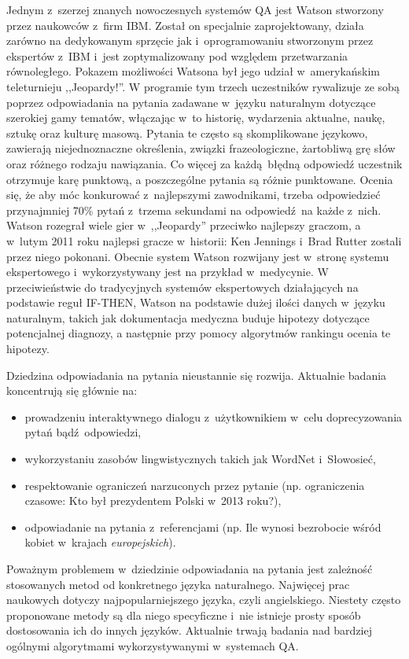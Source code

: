\documentclass[a4paper, twoside, openright, 12pt]{report}
\begin{document}
            Jednym z~szerzej znanych nowoczesnych systemów QA jest Watson stworzony przez naukowców z~firm IBM.
            Został on specjalnie zaprojektowany, działa zarówno na dedykowanym sprzęcie jak i~oprogramowaniu stworzonym
            przez ekspertów z~IBM i~jest zoptymalizowany pod względem przetwarzania równoległego.
            Pokazem możliwości Watsona był jego udział w~amerykańskim teleturnieju ,,Jeopardy!''. W programie tym
            trzech uczestników rywalizuje ze sobą poprzez odpowiadania na pytania zadawane w~języku naturalnym dotyczące
            szerokiej gamy tematów, włączając w~to historię, wydarzenia aktualne, naukę, sztukę oraz kulturę masową.
            Pytania te często są skomplikowane językowo, zawierają niejednoznaczne określenia, związki frazeologiczne,
            żartobliwą grę słów oraz różnego rodzaju nawiązania.
            Co więcej za każdą błędną odpowiedź uczestnik otrzymuje karę punktową, a poszczególne pytania są różnie
            punktowane. Ocenia się, że aby móc konkurować z~najlepszymi zawodnikami, trzeba odpowiedzieć przynajmniej
            70\% pytań z~trzema sekundami na odpowiedź na każde z~nich. Watson rozegrał wiele gier w~,,Jeopardy'' przeciwko
            najlepszy graczom, a w~lutym 2011 roku najlepsi gracze w~historii: Ken Jennings i~Brad Rutter zostali przez
            niego pokonani. Obecnie system Watson rozwijany jest w~stronę systemu ekspertowego i~wykorzystywany jest na
            przykład w~medycynie. W przeciwieństwie do tradycyjnych systemów ekspertowych działających na podstawie
            reguł IF-THEN, Watson na podstawie dużej ilości danych w~języku naturalnym, takich jak  dokumentacja medyczna
            buduje hipotezy dotyczące potencjalnej diagnozy, a następnie przy pomocy algorytmów rankingu ocenia te
            hipotezy\cite{WATSONMEDICINE}.

            Dziedzina odpowiadania na pytania nieustannie się rozwija. Aktualnie badania koncentrują się głównie na:
            \begin{itemize}
                \item prowadzeniu interaktywnego dialogu z~użytkownikiem w~celu doprecyzowania pytań bądź odpowiedzi,
                \item wykorzystaniu zasobów lingwistycznych takich jak WordNet i~Słowosieć,
                \item respektowanie ograniczeń narzuconych przez pytanie (np. ograniczenia czasowe: Kto był prezydentem
                    Polski w~2013 roku?),
                \item odpowiadanie na pytania z~referencjami (np. Ile wynosi bezrobocie wśród kobiet w~krajach \emph{europejskich}).
            \end{itemize}
            Poważnym problemem w~dziedzinie odpowiadania na pytania jest zależność stosowanych metod od konkretnego języka
            naturalnego. Najwięcej prac naukowych dotyczy najpopularniejszego języka, czyli angielskiego. Niestety
            często proponowane metody są dla niego specyficzne i~nie istnieje prosty sposób dostosowania ich do innych
            języków. Aktualnie trwają badania nad bardziej ogólnymi algorytmami wykorzystywanymi w~systemach QA.
\end{document}
